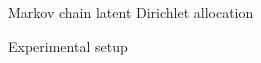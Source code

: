 \documentclass[final]{beamer}
\begin{document}
\begin{frame}[t]
\begin{columns}[T]
\begin{column}{.33\linewidth}
\begin{minipage}[T]{.97\textwidth}
{%


\begin{block}{Markov chain latent Dirichlet allocation}
\end{block}

\begin{block}{Experimental setup}

        
        
        

\end{block}}
\end{minipage}
\end{column}
\end{columns}
\end{frame}
\end{document}
